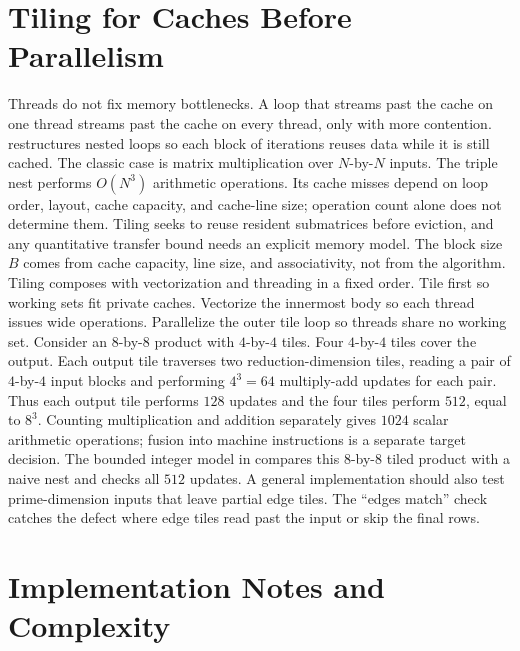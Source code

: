\section{Tiling for Caches Before Parallelism}\label{sec:ch36-tiling}

Threads do not fix memory bottlenecks.
A loop that streams past the cache on one thread streams past the cache on every thread, only with more contention.
 restructures nested loops so each block of iterations reuses data while it is still cached.
The classic case is matrix multiplication over $N$-by-$N$ inputs.
The triple nest performs $O(N^3)$ arithmetic operations.
Its cache misses depend on loop order, layout, cache capacity, and cache-line size; operation count alone does not determine them.
Tiling seeks to reuse resident submatrices before eviction, and any quantitative transfer bound needs an explicit memory model.
The block size $B$ comes from cache capacity, line size, and associativity, not from the algorithm.
Tiling composes with vectorization and threading in a fixed order.
Tile first so working sets fit private caches.
Vectorize the innermost body so each thread issues wide operations.
Parallelize the outer tile loop so threads share no working set.
Consider an $8$-by-$8$ product with $4$-by-$4$ tiles.
Four $4$-by-$4$ tiles cover the output.
Each output tile traverses two reduction-dimension tiles, reading a pair of $4$-by-$4$ input blocks and performing $4^3=64$ multiply-add updates for each pair.
Thus each output tile performs $128$ updates and the four tiles perform $512$, equal to $8^3$.
Counting multiplication and addition separately gives $1024$ scalar arithmetic operations; fusion into machine instructions is a separate target decision.
The bounded integer model in  compares this $8$-by-$8$ tiled product with a naive nest and checks all $512$ updates.
A general implementation should also test prime-dimension inputs that leave partial edge tiles.
The \enquote{edges match} check catches the defect where edge tiles read past the input or skip the final rows.

\section{Implementation Notes and Complexity}\label{sec:ch36-implementation}

